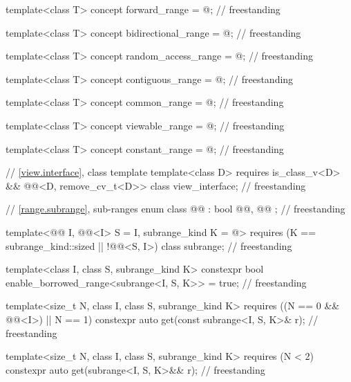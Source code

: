 \begin{codeblock}
{  template<class T>
    concept forward_range = @\seebelow@;                                              // freestanding

  template<class T>
    concept bidirectional_range = @\seebelow@;                                        // freestanding

  template<class T>
    concept random_access_range = @\seebelow@;                                        // freestanding

  template<class T>
    concept contiguous_range = @\seebelow@;                                           // freestanding

  template<class T>
    concept common_range = @\seebelow@;                                               // freestanding

  template<class T>
    concept viewable_range = @\seebelow@;                                             // freestanding

  template<class T>
    concept constant_range = @\seebelow@;                                             // freestanding

  // \ref{view.interface}, class template 
  template<class D>
    requires is_class_v<D> && @@<D, remove_cv_t<D>>
  class view_interface;                                                             // freestanding

  // \ref{range.subrange}, sub-ranges
  enum class @@ : bool { @@, @@ };                               // freestanding

  template<@@ I, @@<I> S = I, subrange_kind K = @\seebelow@>
    requires (K == subrange_kind::sized || !@@<S, I>)
  class subrange;                                                                   // freestanding

  template<class I, class S, subrange_kind K>
    constexpr bool enable_borrowed_range<subrange<I, S, K>> = true;                 // freestanding

  template<size_t N, class I, class S, subrange_kind K>
    requires ((N == 0 && @@<I>) || N == 1)
    constexpr auto get(const subrange<I, S, K>& r);                                 // freestanding

  template<size_t N, class I, class S, subrange_kind K>
    requires (N < 2)
    constexpr auto get(subrange<I, S, K>&& r);                                      // freestanding
}


\end{codeblock}
